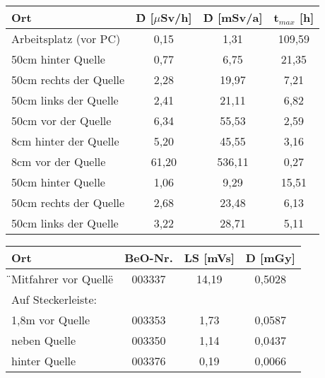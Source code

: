 \minipanf
	\begin{center}
					\begin{tabular}{l|c|c|c}
								\textbf{Ort} & \textbf{\.D} [$\mu$Sv/h] & \textbf{\.D} [mSv/a]  & \textbf{t$_{max}$} [h]\\ 
						\hline  Arbeitsplatz (vor PC) & 0,15  &   1,31 & 109,59\\ 
								50cm hinter Quelle    & 0,77  &   6,75 &  21,35\\ 
								50cm rechts der Quelle& 2,28  &  19,97 &   7,21\\ 
								50cm links der Quelle & 2,41  &  21,11 &   6,82\\ 
								50cm vor der Quelle   & 6,34  &  55,53 &   2,59\\ 
								8cm hinter der Quelle & 5,20  &  45,55 &   3,16\\ 
								8cm vor der Quelle    & 61,20 & 536,11 &   0,27\\
						\hline  50cm hinter Quelle    & 1,06  &   9,29 &  15,51\\
								50cm rechts der Quelle& 2,68  &  23,48 &   6,13\\ 
								50cm links der Quelle & 3,22  &  28,71 &   5,11\\
					\end{tabular}	
					\label{dft:Arbeitsplatz}
					\vspace{8mm}
					\begin{tabular}{l|c|c|c}
								\textbf{Ort} & \textbf{BeO-Nr.} & \textbf{LS} [mVs] & \textbf{D} [mGy] \\
						\hline  \"{}Mitfahrer vor Quelle\" & 003337 & 14,19 & 0,5028 \\
								Auf Steckerleiste:                &        &       &        \\
								 \hspace{3mm} 1,8m vor Quelle     & 003353 & 1,73  & 0,0587 \\
								 \hspace{3mm} neben Quelle        & 003350 & 1,14  & 0,0437 \\
								 \hspace{3mm} hinter Quelle       & 003376 & 0,19  & 0,0066 \\
					\end{tabular}
					\label{dft:Raum}
                    \vspace{8mm}
	\end{center}
\minipend
	
